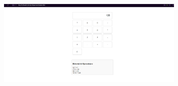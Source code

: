 \documentclass{article}
\begin{document}
\begin{figure}[H]
		          \centering
		          \includegraphics[width=0.8\textwidth,keepaspectratio]                       {img/pruebaCal2.png}
    \end{figure}  
\\
\end{document}
